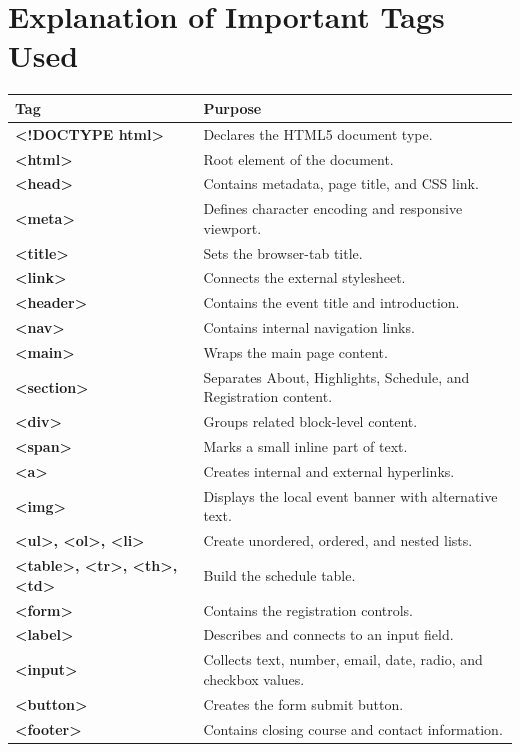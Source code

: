 \documentclass[12pt,a4paper]{article}
\begin{document}
\section{Explanation of Important Tags Used}
\begin{table}[H]
\centering
\renewcommand{\arraystretch}{1.22}
\begin{tabularx}{\textwidth}{>{\ttfamily\bfseries}p{3cm}X}
\toprule
Tag & Purpose \\
\midrule
<!DOCTYPE html> & Declares the HTML5 document type. \\
<html> & Root element of the document. \\
<head> & Contains metadata, page title, and CSS link. \\
<meta> & Defines character encoding and responsive viewport. \\
<title> & Sets the browser-tab title. \\
<link> & Connects the external stylesheet. \\
<header> & Contains the event title and introduction. \\
<nav> & Contains internal navigation links. \\
<main> & Wraps the main page content. \\
<section> & Separates About, Highlights, Schedule, and Registration content. \\
<div> & Groups related block-level content. \\
<span> & Marks a small inline part of text. \\
<a> & Creates internal and external hyperlinks. \\
<img> & Displays the local event banner with alternative text. \\
<ul>, <ol>, <li> & Create unordered, ordered, and nested lists. \\
<table>, <tr>, <th>, <td> & Build the schedule table. \\
<form> & Contains the registration controls. \\
<label> & Describes and connects to an input field. \\
<input> & Collects text, number, email, date, radio, and checkbox values. \\
<button> & Creates the form submit button. \\
<footer> & Contains closing course and contact information. \\
\bottomrule
\end{tabularx}
\end{table}
\end{document}
